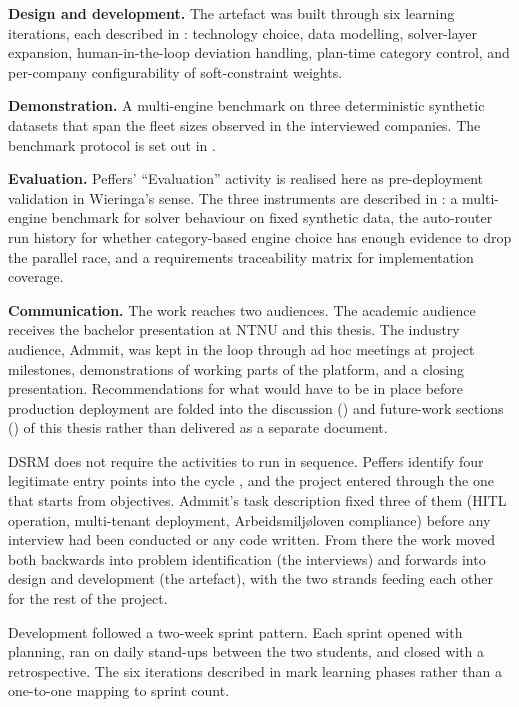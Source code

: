 \textbf{Design and development.} The artefact was built through six learning iterations, each described in : technology choice, data modelling, solver-layer expansion, human-in-the-loop deviation handling, plan-time category control, and per-company configurability of soft-constraint weights.

\textbf{Demonstration.} A multi-engine benchmark on three deterministic synthetic datasets that span the fleet sizes observed in the interviewed companies. The benchmark protocol is set out in .

\textbf{Evaluation.} Peffers' ``Evaluation'' activity is realised here as pre-deployment validation in Wieringa's sense. The three instruments are described in : a multi-engine benchmark for solver behaviour on fixed synthetic data, the auto-router run history for whether category-based engine choice has enough evidence to drop the parallel race, and a requirements traceability matrix for implementation coverage.

\textbf{Communication.} The work reaches two audiences. The academic audience receives the bachelor presentation at NTNU and this thesis. The industry audience, Admmit, was kept in the loop through ad hoc meetings at project milestones, demonstrations of working parts of the platform, and a closing presentation. Recommendations for what would have to be in place before production deployment are folded into the discussion () and future-work sections () of this thesis rather than delivered as a separate document.

DSRM does not require the activities to run in sequence. Peffers identify four legitimate entry points into the cycle \parencite[p.~56]{peffers2007dsrm}, and the project entered through the one that starts from objectives. Admmit's task description fixed three of them (HITL operation, multi-tenant deployment, Arbeidsmiljøloven compliance) before any interview had been conducted or any code written. From there the work moved both backwards into problem identification (the interviews) and forwards into design and development (the artefact), with the two strands feeding each other for the rest of the project.

Development followed a two-week sprint pattern. Each sprint opened with planning, ran on daily stand-ups between the two students, and closed with a retrospective. The six iterations described in  mark learning phases rather than a one-to-one mapping to sprint count.


